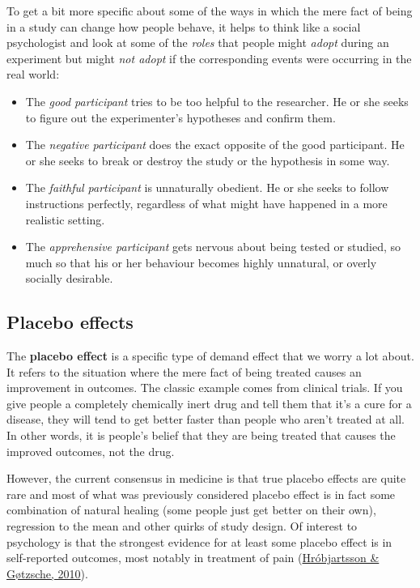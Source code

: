 \documentclass[
]{book}
\providecommand{\tightlist}{%
  \setlength{\itemsep}{0pt}\setlength{\parskip}{0pt}}
\begin{document}
To get a bit more specific about some of the ways in which the mere fact of being in a study can change how people behave, it helps to think like a social psychologist and look at some of the \emph{roles} that people might \emph{adopt} during an experiment but might \emph{not adopt} if the corresponding events were occurring in the real world:

\begin{itemize}
\tightlist
\item
  The \emph{good participant} tries to be too helpful to the researcher. He or she seeks to figure out the experimenter's hypotheses and confirm them.
\item
  The \emph{negative participant} does the exact opposite of the good participant. He or she seeks to break or destroy the study or the hypothesis in some way.
\item
  The \emph{faithful participant} is unnaturally obedient. He or she seeks to follow instructions perfectly, regardless of what might have happened in a more realistic setting.
\item
  The \emph{apprehensive participant} gets nervous about being tested or studied, so much so that his or her behaviour becomes highly unnatural, or overly socially desirable.
\end{itemize}

\hypertarget{placebo-effects}{%
\subsection{Placebo effects}\label{placebo-effects}}

The {\textbf{placebo effect}} is a specific type of demand effect that we worry a lot about. It refers to the situation where the mere fact of being treated causes an improvement in outcomes. The classic example comes from clinical trials. If you give people a completely chemically inert drug and tell them that it's a cure for a disease, they will tend to get better faster than people who aren't treated at all. In other words, it is people's belief that they are being treated that causes the improved outcomes, not the drug.

However, the current consensus in medicine is that true placebo effects are quite rare and most of what was previously considered placebo effect is in fact some combination of natural healing (some people just get better on their own), regression to the mean and other quirks of study design. Of interest to psychology is that the strongest evidence for at least some placebo effect is in self-reported outcomes, most notably in treatment of pain (\protect\hyperlink{ref-hrobjartsson2010}{Hróbjartsson \& Gøtzsche, 2010}).
\end{document}
